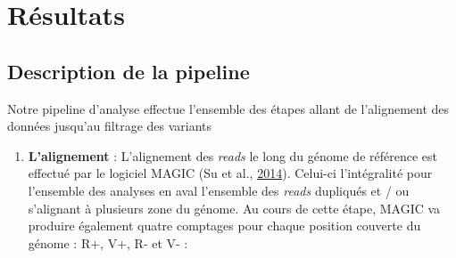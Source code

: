 \documentclass[12pt,twoside]{reedthesis}
\providecommand{\tightlist}{%
  \setlength{\itemsep}{0pt}\setlength{\parskip}{0pt}}
\theoremstyle{definition}
\theoremstyle{definition}
\theoremstyle{remark}
\begin{document}
  \section{Résultats}\label{resultats}
  
  \subsection{Description de la
  pipeline}\label{description-de-la-pipeline}
  
  Notre pipeline d'analyse effectue l'ensemble des étapes allant de
  l'alignement des données jusqu'au filtrage des variants
  
  \begin{enumerate}
  \def\labelenumi{\arabic{enumi}.}
  \tightlist
  \item
    \textbf{L'alignement} : L'alignement des \emph{reads} le long du
    génome de référence est effectué par le logiciel MAGIC (Su et al.,
    \protect\hyperlink{ref-Su2014}{2014}). Celui-ci l'intégralité pour
    l'ensemble des analyses en aval l'ensemble des \emph{reads} dupliqués
    et / ou s'alignant à plusieurs zone du génome. Au cours de cette
    étape, MAGIC va produire également quatre comptages pour chaque
    position couverte du génome : R+, V+, R- et V- :
  

\end{enumerate}
\end{document}

